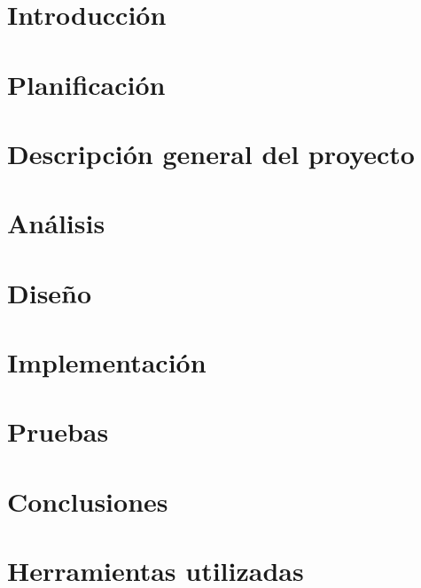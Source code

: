 \documentclass[a4paper,11pt]{book}
\begin{document}
\renewcommand{\figurename}{Figura}
\renewcommand{\listfigurename}{Indice de figuras}
\renewcommand{\tablename}{Tabla}
\renewcommand{\listtablename}{Indice de tablas}

\pagestyle{empty}

\cleardoublepage


\cleardoublepage
\pagestyle{plain}

\frontmatter %


\cleardoublepage

\tableofcontents
\listoffigures
\listoftables

\mainmatter %

\chapter{Introducción}

\chapter{Planificación}

\chapter{Descripción general del proyecto}

\chapter{Análisis}

\chapter{Diseño}

\chapter{Implementación}

\chapter{Pruebas}

\chapter{Conclusiones}


\appendix
\chapter{Herramientas utilizadas}

\end{document}
